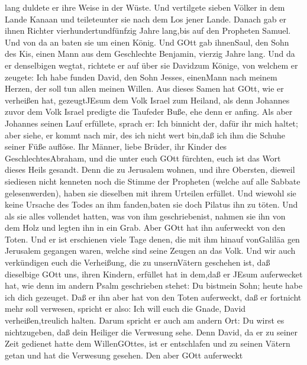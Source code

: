 lang duldete er ihre Weise in der Wüste.  Und vertilgete
sieben Völker in dem Lande Kanaan und teileteunter sie nach dem Los
jener Lande.  Danach gab er ihnen Richter
vierhundertundfünfzig Jahre lang,bis auf den Propheten Samuel.
 Und von da an baten sie um einen König. Und GOtt gab
ihnenSaul, den Sohn des Kis, einen Mann aus dem Geschlechte Benjamin,
vierzig Jahre lang.  Und da er denselbigen wegtat, richtete
er auf über sie Davidzum Könige, von welchem er zeugete: Ich habe funden
David, den Sohn Jesses, einenMann nach meinem Herzen, der soll tun allen
meinen Willen.  Aus dieses Samen hat GOtt, wie er verheißen
hat, gezeugtJEsum dem Volk Israel zum Heiland,  als denn
Johannes zuvor dem Volk Israel predigte die Taufeder Buße, ehe denn er
anfing.  Als aber Johannes seinen Lauf erfüllete, sprach
er: Ich binnicht der, dafür ihr mich haltet; aber siehe, er kommt nach
mir, des ich nicht wert bin,daß ich ihm die Schuhe seiner Füße auflöse.
 Ihr Männer, liebe Brüder, ihr Kinder des
GeschlechtesAbraham, und die unter euch GOtt fürchten, euch ist das Wort
dieses Heils gesandt.  Denn die zu Jerusalem wohnen, und
ihre Obersten, dieweil siediesen nicht kenneten noch die Stimme der
Propheten (welche auf alle Sabbate gelesenwerden), haben sie dieselben
mit ihrem Urteilen erfüllet.  Und wiewohl sie keine Ursache
des Todes an ihm fanden,baten sie doch Pilatus ihn zu töten.
 Und als sie alles vollendet hatten, was von ihm
geschriebenist, nahmen sie ihn von dem Holz und legten ihn in ein Grab.
 Aber GOtt hat ihn auferweckt von den Toten. 
Und er ist erschienen viele Tage denen, die mit ihm hinauf vonGaliläa
gen Jerusalem gegangen waren, welche sind seine Zeugen an das Volk.
 Und wir auch verkündigen euch die Verheißung, die zu
unsernVätern geschehen ist,  daß dieselbige GOtt uns, ihren
Kindern, erfüllet hat in dem,daß er JEsum auferwecket hat, wie denn im
andern Psalm geschrieben stehet: Du bistmein Sohn; heute habe ich dich
gezeuget.  Daß er ihn aber hat von den Toten auferweckt,
daß er fortnicht mehr soll verwesen, spricht er also: Ich will euch die
Gnade, David verheißen,treulich halten.  Darum spricht er
auch am andern Ort: Du wirst es nichtzugeben, daß dein Heiliger die
Verwesung sehe.  Denn David, da er zu seiner Zeit gedienet
hatte dem WillenGOttes, ist er entschlafen und zu seinen Vätern getan
und hat die Verwesung gesehen.  Den aber GOtt auferweckt
